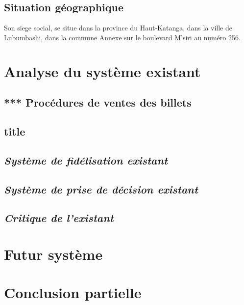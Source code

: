         \subsection[Situation géographique]{Situation géographique}
        Son siege social, se situe dans la province du Haut-Katanga, dans la ville de Lubumbashi,
        dans la commune Annexe sur le boulevard M'siri au numéro 256.
    \section[Analyse du système existant]{Analyse du système existant}
        \subsection[short]{*** Procédures de ventes des billets}
        \subsection[short]{title}
        \subsection[short]{\textit{Système de fidélisation existant}}
        \subsection[short]{\textit{Système de prise de décision existant}}
        \subsection[Critique de l’existant]{\textit{Critique de l’existant}}
    \section[Futur système]{Futur système}
    \section[Conclusion partielle]{Conclusion partielle}